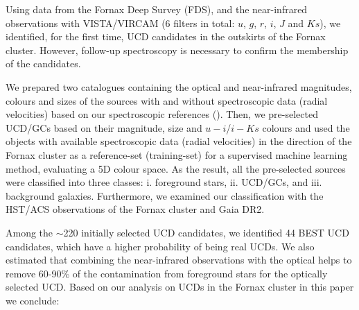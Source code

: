 \documentclass[fleqn,usenatbib]{mnras}
\begin{document}
Using data from the Fornax Deep Survey (FDS), and the near-infrared observations with VISTA/VIRCAM (6 filters in total: $u$, $g$, $r$, $i$, $J$ and $Ks$), we identified, for the first time, UCD candidates in the outskirts of the Fornax cluster. However, follow-up spectroscopy is necessary to confirm the membership of the candidates. 

We prepared two catalogues containing the optical and near-infrared magnitudes, colours and sizes of the sources with and without spectroscopic data (radial velocities) based on our spectroscopic references (\citealp{wittmann-2016,Pota-2018,Maddox-2019}). Then, we pre-selected UCD/GCs based on their magnitude, size and $u-i$/$i-Ks$ colours and used the objects with available spectroscopic data (radial velocities) in the direction of the Fornax cluster as a reference-set (training-set) for a supervised machine learning method, evaluating a 5D colour space. As the result, all the pre-selected sources were classified into three classes: i. foreground stars, ii. UCD/GCs, and iii. background galaxies. Furthermore, we examined our classification with the HST/ACS observations of the Fornax cluster and Gaia DR2.

Among the $\sim$220 initially selected UCD candidates, we identified 44 BEST UCD candidates, which have a higher probability of being real UCDs. We also estimated that combining the near-infrared observations with the optical helps to remove 60-90\% of the contamination from foreground stars for the optically selected UCD. Based on our analysis on UCDs in the Fornax cluster in this paper we conclude:
\end{document}

